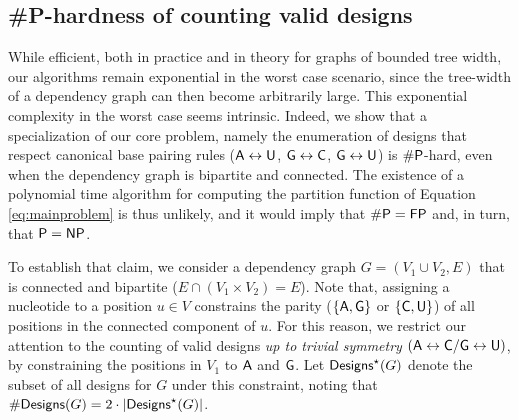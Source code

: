 \documentclass[]{bmcart}
\newcommand{\real}{\mathbb{R}}
\newcommand{\Def}[1]{\emph{#1}}
\newcommand{\Design}[1]{{\sf Designs}^{\star}(#1)}
\newcommand{\NumDesign}{\ensuremath{\#}{\sf Designs}\xspace}
\newcommand{\Nuc}[1]{{\sf #1}}
\newcommand{\Ab}{\Nuc{A}}
\newcommand{\Cb}{\Nuc{C}}
\newcommand{\Gb}{\Nuc{G}}
\newcommand{\Ub}{\Nuc{U}}
\newcommand{\citep}[1]{\cite{#1}}
\newcommand{\revised}[1]{{\color{red} #1}}
\begin{document}
\subsection*{\#{\sf P}-hardness of counting valid designs}\label{sec:counting}
\revised{While efficient, both in practice and in theory for graphs of bounded tree width, our algorithms remain exponential in the worst case scenario, since the tree-width of a dependency graph can then become arbitrarily large. This exponential complexity in the worst case seems intrinsic. Indeed, we show that a specialization of our core problem, namely the enumeration of designs that respect canonical base pairing rules ($\Ab \leftrightarrow \Ub$, $\Gb \leftrightarrow \Cb$, $\Gb \leftrightarrow \Ub$) is $\#{\sf P}$-hard, even when the dependency graph is bipartite and connected. The existence of a polynomial time algorithm for computing the partition function of Equation \eqref{eq:mainproblem} is thus unlikely, and it would imply that  ${\sf\# P}={\sf FP}$ and, in turn, that ${\sf P}={\sf NP}$.}

%

To establish that claim, we consider a dependency graph $G=(V_1\cup V_2, E)$ that is connected and bipartite ($E \cap (V_1\times V_2) = E$). Note that, assigning a nucleotide to a position $u\in V$ constrains the parity ($\{\Ab,\Gb\}$ or $\{\Cb,\Ub\}$) of all positions in the connected component of $u$. For this reason, we restrict our attention to the counting of valid designs \emph{up to trivial  symmetry} $(\Ab\leftrightarrow \Cb/\Gb\leftrightarrow \Ub)$, by constraining the positions in $V_{1}$ to $\Ab$ and $\Gb$. Let $\Design{G}$ denote the subset of all designs for $G$ under this constraint, noting that $\NumDesign(G) = 2\cdot|\Design{G}|$.
\end{document}
